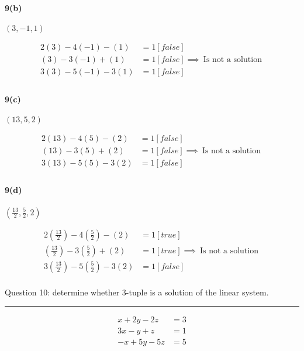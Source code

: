 \documentclass[a4paper,11pt,twoside]{report}
\begin{document}
\paragraph{9(b)} $(3, -1, 1)$

\begin{align*}
	2(3) - 4(-1) - (1) &= 1  [false]\\
	(3) - 3(-1) + (1) &= 1 [false]  \implies \boxed{\:\text{Is not a solution}\:}\\
	3(3) - 5(-1) - 3(1) &= 1 [false] \\
\end{align*}

\paragraph{9(c)} $(13, 5, 2)$

\begin{align*}
	2(13) - 4(5) - (2) &= 1  [false]\\
	(13) - 3(5) + (2) &= 1 [false]  \implies \boxed{\:\text{Is not a solution}\:}\\
	3(13) - 5(5) - 3(2) &= 1 [false] \\
\end{align*}

\paragraph{9(d)} $\left( \frac{13}{2},\frac{5}{2},2 \right) $

\begin{align*}
	2\left( \frac{13}{2} \right)  - 4 \left( \frac{5}{2} \right)   - (2) &= 1  [true]\\
	\left( \frac{13}{2} \right)  - 3\left( \frac{5}{2} \right)  + (2) &= 1 [true]  \implies \boxed{\:\text{Is not a solution}\:}\\
	3\left( \frac{13}{2} \right)  - 5\left( \frac{5}{2} \right)  - 3(2) &= 1 [false] \\
\end{align*}


\noindent Question 10: determine whether 3-tuple is a solution of the linear system. \\ \hrule

\begin{align*}
	x + 2y - 2z &=  3 \\
	3x - y + z &= 1 \\
	-x + 5y - 5z &= 5 \\
\end{align*}
\end{document}
